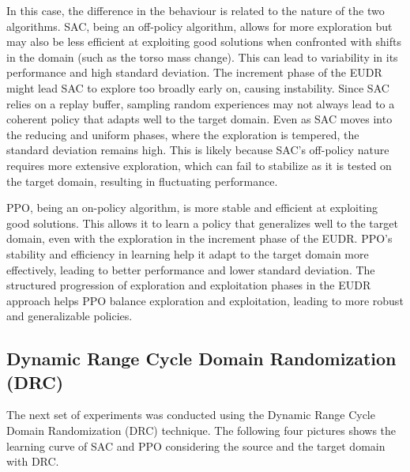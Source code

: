 \documentclass[12pt]{article}
\begin{document}
In this case, the difference in the behaviour is related to the nature of the two algorithms. SAC, being an off-policy algorithm, allows for more exploration but may also be less efficient at exploiting good solutions when confronted with shifts in the domain (such as the torso mass change). This can lead to variability in its performance and high standard deviation. The increment phase of the EUDR might lead SAC to explore too broadly early on, causing instability. Since SAC relies on a replay buffer, sampling random experiences may not always lead to a coherent policy that adapts well to the target domain. Even as SAC moves into the reducing and uniform phases, where the exploration is tempered, the standard deviation remains high. This is likely because SAC’s off-policy nature requires more extensive exploration, which can fail to stabilize as it is tested on the target domain, resulting in fluctuating performance.

PPO, being an on-policy algorithm, is more stable and efficient at exploiting good solutions. This allows it to learn a policy that generalizes well to the target domain, even with the exploration in the increment phase of the EUDR. PPO’s stability and efficiency in learning help it adapt to the target domain more effectively, leading to better performance and lower standard deviation. The structured progression of exploration and exploitation phases in the EUDR approach helps PPO balance exploration and exploitation, leading to more robust and generalizable policies.

\subsection{Dynamic Range Cycle Domain Randomization (DRC)}

The next set of experiments was conducted using the Dynamic Range Cycle Domain Randomization (DRC) technique. The following four pictures shows the learning curve of SAC and PPO considering the source and the target domain with DRC.
\end{document}
